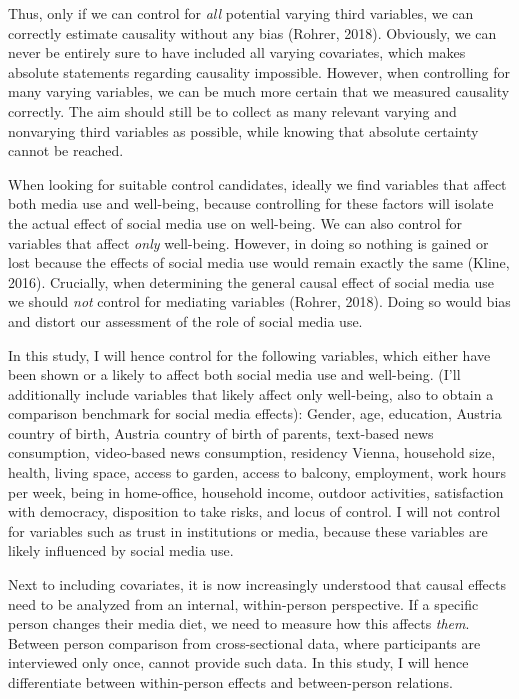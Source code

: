 \documentclass[
  english,
  man,mask,floatsintext]{apa6}
\begin{document}
Thus, only if we can control for \emph{all} potential varying third variables, we can correctly estimate causality without any bias (Rohrer, 2018).
Obviously, we can never be entirely sure to have included all varying covariates, which makes absolute statements regarding causality impossible.
However, when controlling for many varying variables, we can be much more certain that we measured causality correctly.
The aim should still be to collect as many relevant varying and nonvarying third variables as possible, while knowing that absolute certainty cannot be reached.

When looking for suitable control candidates, ideally we find variables that affect both media use and well-being, because controlling for these factors will isolate the actual effect of social media use on well-being.
We can also control for variables that affect \emph{only} well-being.
However, in doing so nothing is gained or lost because the effects of social media use would remain exactly the same (Kline, 2016).
Crucially, when determining the general causal effect of social media use we should \emph{not} control for mediating variables (Rohrer, 2018).
Doing so would bias and distort our assessment of the role of social media use.

In this study, I will hence control for the following variables, which either have been shown or a likely to affect both social media use and well-being.
(I'll additionally include variables that likely affect only well-being, also to obtain a comparison benchmark for social media effects):
Gender, age, education, Austria country of birth, Austria country of birth of parents, text-based news consumption, video-based news consumption, residency Vienna, household size, health, living space, access to garden, access to balcony, employment, work hours per week, being in home-office, household income, outdoor activities, satisfaction with democracy, disposition to take risks, and locus of control.
I will not control for variables such as trust in institutions or media, because these variables are likely influenced by social media use.

Next to including covariates, it is now increasingly understood that causal effects need to be analyzed from an internal, within-person perspective.
If a specific person changes their media diet, we need to measure how this affects \emph{them}.
Between person comparison from cross-sectional data, where participants are interviewed only once, cannot provide such data.
In this study, I will hence differentiate between within-person effects and between-person relations.
\end{document}
